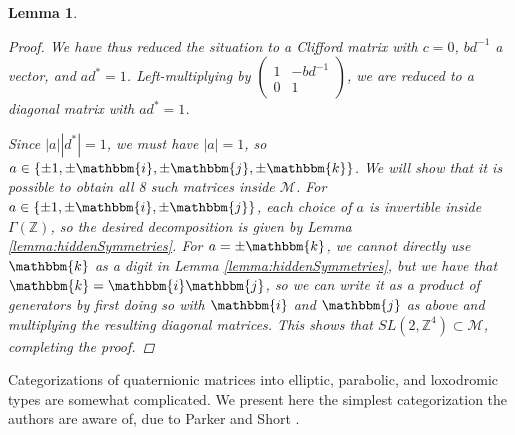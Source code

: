 \documentclass[reqno,10pt]{amsart}
\newcommand{\ii}{\mathbbm{i}}
\newcommand{\Z}{\mathbb{Z}}
\newcommand{\kk}{\mathbbm{k}}
\newcommand{\jj}{\mathbbm{j}}
\newcommand{\norm}[1]{\left\vert #1 \right \vert}
\newtheorem{lemma}[thm]{Lemma}
\numberwithin{thm}{section}
\theoremstyle{definition}
\theoremstyle{definition}
\numberwithin{equation}{section}
\newcommand{\Mod}{\mathcal M}
\begin{document}
\begin{lemma}
\begin{proof}
We have thus reduced the situation to a Clifford matrix with $c=0$, $bd^{-1}$ a vector, and $ad^*=1$. Left-multiplying by $\begin{pmatrix}1&-bd^{-1}\\0&1\end{pmatrix}$, we are reduced to a diagonal matrix with $ad^*=1$.

Since $\norm{a}\norm{d^*}=1$, we must have $\norm{a}=1$, so $a\in \{\pm 1, \pm \ii ,\pm \jj, \pm \kk\}$. We will show that it is possible to obtain all 8 such matrices inside $\Mod$. For $a\in \{\pm 1, \pm \ii, \pm \jj\}$, each choice of $a$ is invertible inside $\Gamma(\Z)$, so the desired decomposition is given by Lemma \ref{lemma:hiddenSymmetries}. For $a=\pm \kk$, we cannot directly use $\kk$ as a digit in Lemma \ref{lemma:hiddenSymmetries}, but we have that $\kk=\ii\jj$, so we can write it as a product of generators by first doing so with $\ii$ and $\jj$ as above and multiplying the resulting diagonal matrices.
This shows that $SL(2,\Z^4)\subset \Mod$, completing the proof.
\end{proof}
\end{lemma}


Categorizations of quaternionic matrices into elliptic, parabolic, and loxodromic types are somewhat complicated. We present here the simplest categorization the authors are aware of, due to Parker and Short \cite{parker2009conjugacy}.
\end{document}
